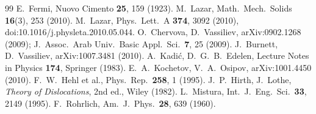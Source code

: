 \documentclass[12pt,a4paper]{article}
\begin{document}
\begin{thebibliography}{99}
 E.~Fermi, Nuovo Cimento \textbf{25}, 159 (1923).
 M.~Lazar, Math.\ Mech.\ Solids \textbf{16}(3), 253 (2010).
 M.~Lazar, Phys.\ Lett.\ A \textbf{374}, 3092 (2010), doi:10.1016/j.physleta.2010.05.044.
 O.~Chervova, D.~Vassiliev, arXiv:0902.1268 (2009); J.\ Assoc.\ Arab Univ.\ Basic Appl.\ Sci.\ \textbf{7}, 25 (2009).
 J.~Burnett, D.~Vassiliev, arXiv:1007.3481 (2010).
 A.~Kadi\'c, D.~G.~B.~Edelen, Lecture Notes in Physics \textbf{174}, Springer (1983).
 E.~A.~Kochetov, V.~A.~Osipov, arXiv:1001.4450 (2010).
 F.~W.~Hehl et al., Phys.\ Rep.\ \textbf{258}, 1 (1995).
 J.~P.~Hirth, J.~Lothe, \emph{Theory of Dislocations}, 2nd ed., Wiley (1982).
 L.~Mistura, Int.\ J.\ Eng.\ Sci.\ \textbf{33}, 2149 (1995).
 F.~Rohrlich, Am.\ J.\ Phys.\ \textbf{28}, 639 (1960).
\end{thebibliography}
\end{document}
